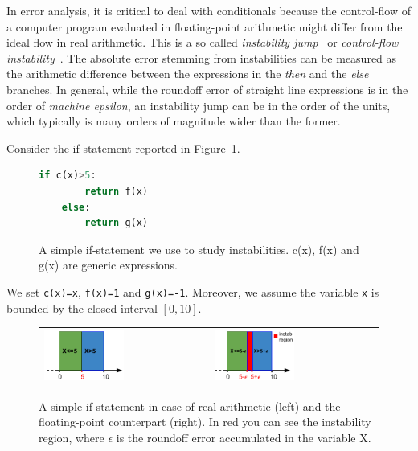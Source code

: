 In error analysis, it is critical to deal with conditionals because the control-flow of a computer program evaluated in floating-point arithmetic might differ from the ideal flow in real arithmetic.
%
%
This is a so called \emph{instability jump}~\cite{satire} or \emph{control-flow instability}~\cite{unstable}.
%
The absolute error stemming from instabilities can be measured as the arithmetic difference between the expressions in the \emph{then} and the \emph{else} branches.
%
In general, while the roundoff error of straight line expressions is in the order of \emph{machine epsilon}, an instability jump can be in the order of the units, which typically is many orders of magnitude wider than the former.
%

Consider the if-statement reported in Figure~\ref{fig:ifstatement}. 
%
\begin{figure}[h!]
	\begin{lstlisting}[frame=single, language=Python]
	if c(x)>5:
		return f(x)
	else:
		return g(x)	
	\end{lstlisting}
	\caption{A simple if-statement we use to study instabilities. c(x), f(x) and g(x) are generic expressions.}\label{fig:ifstatement}
\end{figure}
%

We set \lstinline{c(x)=x}, \lstinline{f(x)=1} and \lstinline{g(x)=-1}.
%
Moreover, we assume the variable \lstinline{x} is bounded by the closed interval $[0,10]$.

\begin{figure}[h!]
	\centering
	\begin{tabular}{ll}
		\includegraphics[width=0.5\textwidth]{pic/ifreal.png}
		&
		\includegraphics[width=0.5\textwidth]{pic/iffp.png}
	\end{tabular}
	\caption{A simple if-statement in case of real arithmetic (left) and the floating-point counterpart (right). In red you can see the instability region, where $\epsilon$ is the roundoff error accumulated in the variable X.}
	\label{fig:ifreal}
\end{figure}

